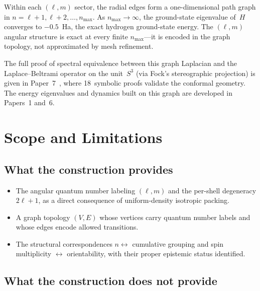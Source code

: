 \documentclass[aps,prl,reprint,amsmath,amssymb]{revtex4-2}
\begin{document}
Within each $(\ell, m)$ sector, the radial edges form a
one-dimensional path graph in $n = \ell+1, \ell+2, \ldots, n_{\max}$.
As $n_{\max} \to \infty$, the ground-state eigenvalue of~$H$
converges to $-0.5$~Ha, the exact hydrogen ground-state energy.  The
$(\ell, m)$ angular structure is exact at every finite $n_{\max}$---it
is encoded in the graph topology, not approximated by mesh refinement.

The full proof of spectral equivalence between this graph Laplacian
and the Laplace--Beltrami operator on the unit~$S^3$ (via Fock's
stereographic projection) is given in Paper~7~\cite{paper7}, where
18~symbolic proofs validate the conformal geometry.  The energy
eigenvalues and dynamics built on this graph are developed in
Papers~1 and~6.


\section{Scope and Limitations}
\label{sec:scope}

\subsection{What the construction provides}

\begin{itemize}
\item[$\checkmark$] The angular quantum number labeling $(\ell, m)$
  and the per-shell degeneracy $2\ell + 1$, as a direct consequence of
  uniform-density isotropic packing.

\item[$\checkmark$] A graph topology $(V, E)$ whose vertices carry
  quantum number labels and whose edges encode allowed transitions.

\item[$\checkmark$] The structural correspondences $n \leftrightarrow$
  cumulative grouping and spin multiplicity $\leftrightarrow$
  orientability, with their proper epistemic status identified.
\end{itemize}

\subsection{What the construction does not provide}
\end{document}
